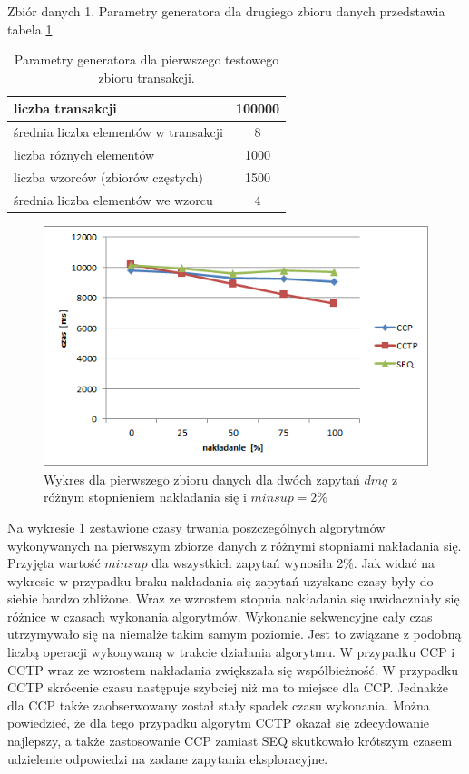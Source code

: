 Zbiór danych 1. Parametry generatora dla drugiego zbioru danych przedstawia tabela \ref{table:firstDataSetParams}.
\begin{table}[h]
\begin{center}
	\begin{tabular}{| l | c |}
		\hline
		liczba transakcji & 100000 \\ \hline
		średnia liczba elementów w transakcji & 8 \\ \hline
		liczba różnych elementów & 1000 \\ \hline
		liczba wzorców (zbiorów częstych) & 1500 \\ \hline
		średnia liczba elementów we wzorcu & 4 \\ 
		\hline
	\end{tabular}
\end{center}
\caption{Parametry generatora dla pierwszego testowego zbioru transakcji.}
\label{table:firstDataSetParams}
\end{table}

\begin{figure}[h]
	\centering
	\includegraphics[width=0.8\linewidth]{figures/chart_100_2}
	\caption{Wykres dla pierwszego zbioru danych dla dwóch zapytań \(dmq\) z różnym stopnieniem nakładania się i \(minsup = 2\%\)}
	\label{fig:chart_100_2}
\end{figure}

Na wykresie \ref{fig:chart_100_2} zestawione czasy trwania poszczególnych algorytmów wykonywanych na pierwszym zbiorze danych z różnymi stopniami nakładania się. Przyjęta wartość \(minsup\) dla wszystkich zapytań wynosiła 2\%. Jak widać na wykresie w przypadku braku nakładania się zapytań uzyskane czasy były do siebie bardzo zbliżone. Wraz ze wzrostem stopnia nakładania się uwidaczniały się różnice w czasach wykonania algorytmów. Wykonanie sekwencyjne cały czas utrzymywało się na niemalże takim samym poziomie. Jest to związane z podobną liczbą operacji wykonywaną w trakcie działania algorytmu. W przypadku CCP i CCTP wraz ze wzrostem nakładania zwiększała się współbieżność. W przypadku CCTP skrócenie czasu następuje szybciej niż ma to miejsce dla CCP. Jednakże dla CCP także zaobserwowany został stały spadek czasu wykonania. Można powiedzieć, że dla tego przypadku algorytm CCTP okazał się zdecydowanie najlepszy, a także zastosowanie CCP zamiast SEQ skutkowało krótszym czasem udzielenie odpowiedzi na zadane zapytania eksploracyjne.

